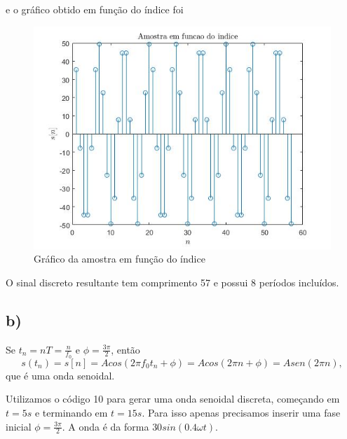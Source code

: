 \documentclass[a4paper, 12pt]{article}
\begin{document}
e o gráfico obtido em função do índice foi

\begin{figure}[H]
	\centering
	\includegraphics[scale=0.7]{../Imagens/ex3/a2.jpg}  
	\caption{Gráfico da amostra em função do índice}
	\label{fig:3a2}
\end{figure}

O sinal discreto resultante tem comprimento 57 e possui 8 períodos incluídos.

\subsection{b)}
Se $t_n = nT=\frac{n}{f_0}$ e $\phi=\frac{3\pi}{2}$, então 
$$s(t_n)=s[n]=Acos(2\pi f_0t_n+\phi)=Acos(2\pi n + \phi)=Asen(2\pi n),$$
que é uma onda senoidal.

Utilizamos o código 10 para gerar uma onda senoidal discreta, começando em $t=5s$ e terminando em $t=15s$. Para isso apenas precisamos inserir uma fase inicial $\phi=\frac{3\pi}{2}$. A onda é da forma $30sin(0.4\omega t)$.


\end{document}
